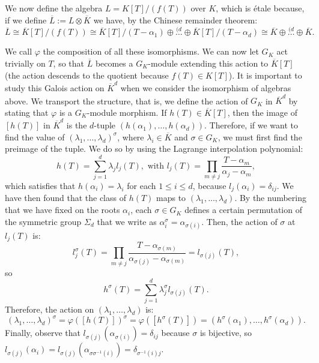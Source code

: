 \documentclass[a4paper, 12pt]{amsart}
\theoremstyle{definition}
\theoremstyle{plain}
\theoremstyle{plain}
\theoremstyle{plain}
\theoremstyle{plain}
\theoremstyle{remark}
\theoremstyle{remark}
\theoremstyle{plain}
\begin{document}
	We now define the algebra $L=K[T]/(f(T))$ over $K$, which is étale because, if we define $\overline{L}:=L\otimes \overline{K}$ we have, by the Chinese remainder theorem:
	\begin{equation*}
		\overline{L}\cong\overline{K}[T]/(f(T))\cong\overline{K}[T]/(T-\alpha_1)\oplus\overset{(d}{\ldots}\oplus\overline{K}[T]/(T-\alpha_d)\cong \overline{K}\oplus \overset{(d}{\ldots} \oplus\overline{K}.
	\end{equation*}
	
	We call $\varphi$ the composition of all these isomorphisms. We can now let $G_K$ act trivially on $T$, so that $\overline{L}$ becomes a $G_K$-module extending this action to $\overline{K}[T]$ (the action descends to the quotient because $f(T)\in K[T]$). It is important to study this Galois action on $\overline{K}^d$ when we consider the isomorphism of algebras above. We transport the structure, that is, we define the action of $G_K$ in $\overline{K}^d$ by stating that $\varphi$ is a $G_K$-module morphism. If $h(T)\in\overline{K}[T]$, then the image of $[h(T)]$ in $\overline{K}^d$ is the $d$-tuple $(h(\alpha_1),\ldots,h(\alpha_d))$. Therefore, if we want to find the value of $(\lambda_1,\ldots,\lambda_d)^\sigma$, where $\lambda_i\in\overline{K}$ and $\sigma\in G_K$, we must first find the preimage of the tuple. We do so by using the Lagrange interpolation polynomial:
	\begin{equation*}
		h(T)=\sum_{j=1}^d\lambda_j l_j(T),\text{ with } l_j(T)=\prod_{m\neq j}\frac{T-\alpha_m}{\alpha_j-\alpha_m},
	\end{equation*}
	which satisfies that $h(\alpha_i)=\lambda_i$ for each $1\le i \le d$, because $l_j(\alpha_i)=\delta_{ij}$. We have then found that the class of $h(T)$ maps to $(\lambda_1,\ldots,\lambda_d)$. By the numbering that we have fixed on the roots $\alpha_i$, each $\sigma\in G_K$ defines a certain permutation of the symmetric group $\Sigma_d$ that we write as $\alpha_i^\sigma=\alpha_{\sigma(i)}$. Then, the action of $\sigma$ at $l_j(T)$ is:
	\begin{equation*}
		l_j^\sigma(T)=\prod_{m\neq j}\frac{T-\alpha_{\sigma(m)}}{\alpha_{\sigma(j)}-\alpha_{\sigma(m)}}=l_{\sigma(j)}(T),
	\end{equation*}
	so
	\begin{equation*}
		h^\sigma(T)=\sum_{j=1}^d \lambda_j^\sigma l_{\sigma(j)}(T).
	\end{equation*}
	Therefore, the action on $(\lambda_1,\ldots,\lambda_d)$ is:
	\begin{equation*}
		(\lambda_1,\ldots,\lambda_d)^\sigma=\varphi([h(T)])^\sigma=\varphi([h^\sigma(T)])=(h^\sigma(\alpha_1),\ldots,h^\sigma(\alpha_d)).
	\end{equation*}
	Finally, observe that $l_{\sigma(j)}(\alpha_{\sigma(i)})=\delta_{ij}$ because $\sigma$ is bijective, so $l_{\sigma(j)}(\alpha_i)=l_{\sigma(j)}(\alpha_{\sigma\sigma^{-1}(i)})=\delta_{\sigma^{-1}(i)j}$.
	
\end{document}
